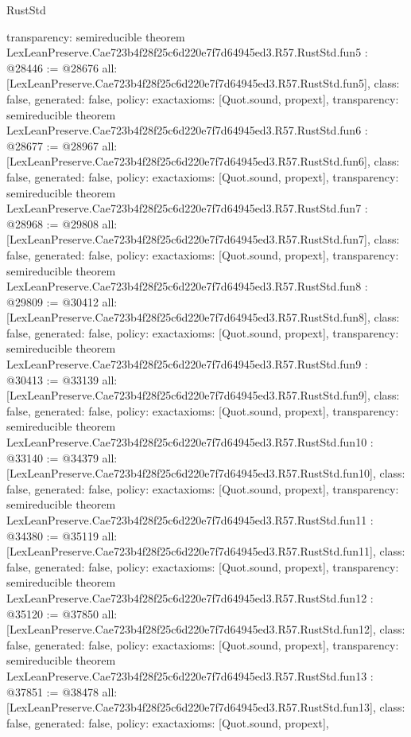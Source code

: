 \begin{lexlean}{RustStd}
\begin{coremodule}
{  transparency: semireducible
}
theorem LexLeanPreserve.Cae723b4f28f25c6d220e7f7d64945ed3.R57.RustStd.fun5 : @28446 := @28676 {
  all: [LexLeanPreserve.Cae723b4f28f25c6d220e7f7d64945ed3.R57.RustStd.fun5],
  class: false,
  generated: false,
  policy: exact{axioms: [Quot.sound, propext]},
  transparency: semireducible
}
theorem LexLeanPreserve.Cae723b4f28f25c6d220e7f7d64945ed3.R57.RustStd.fun6 : @28677 := @28967 {
  all: [LexLeanPreserve.Cae723b4f28f25c6d220e7f7d64945ed3.R57.RustStd.fun6],
  class: false,
  generated: false,
  policy: exact{axioms: [Quot.sound, propext]},
  transparency: semireducible
}
theorem LexLeanPreserve.Cae723b4f28f25c6d220e7f7d64945ed3.R57.RustStd.fun7 : @28968 := @29808 {
  all: [LexLeanPreserve.Cae723b4f28f25c6d220e7f7d64945ed3.R57.RustStd.fun7],
  class: false,
  generated: false,
  policy: exact{axioms: [Quot.sound, propext]},
  transparency: semireducible
}
theorem LexLeanPreserve.Cae723b4f28f25c6d220e7f7d64945ed3.R57.RustStd.fun8 : @29809 := @30412 {
  all: [LexLeanPreserve.Cae723b4f28f25c6d220e7f7d64945ed3.R57.RustStd.fun8],
  class: false,
  generated: false,
  policy: exact{axioms: [Quot.sound, propext]},
  transparency: semireducible
}
theorem LexLeanPreserve.Cae723b4f28f25c6d220e7f7d64945ed3.R57.RustStd.fun9 : @30413 := @33139 {
  all: [LexLeanPreserve.Cae723b4f28f25c6d220e7f7d64945ed3.R57.RustStd.fun9],
  class: false,
  generated: false,
  policy: exact{axioms: [Quot.sound, propext]},
  transparency: semireducible
}
theorem LexLeanPreserve.Cae723b4f28f25c6d220e7f7d64945ed3.R57.RustStd.fun10 : @33140 := @34379 {
  all: [LexLeanPreserve.Cae723b4f28f25c6d220e7f7d64945ed3.R57.RustStd.fun10],
  class: false,
  generated: false,
  policy: exact{axioms: [Quot.sound, propext]},
  transparency: semireducible
}
theorem LexLeanPreserve.Cae723b4f28f25c6d220e7f7d64945ed3.R57.RustStd.fun11 : @34380 := @35119 {
  all: [LexLeanPreserve.Cae723b4f28f25c6d220e7f7d64945ed3.R57.RustStd.fun11],
  class: false,
  generated: false,
  policy: exact{axioms: [Quot.sound, propext]},
  transparency: semireducible
}
theorem LexLeanPreserve.Cae723b4f28f25c6d220e7f7d64945ed3.R57.RustStd.fun12 : @35120 := @37850 {
  all: [LexLeanPreserve.Cae723b4f28f25c6d220e7f7d64945ed3.R57.RustStd.fun12],
  class: false,
  generated: false,
  policy: exact{axioms: [Quot.sound, propext]},
  transparency: semireducible
}
theorem LexLeanPreserve.Cae723b4f28f25c6d220e7f7d64945ed3.R57.RustStd.fun13 : @37851 := @38478 {
  all: [LexLeanPreserve.Cae723b4f28f25c6d220e7f7d64945ed3.R57.RustStd.fun13],
  class: false,
  generated: false,
  policy: exact{axioms: [Quot.sound, propext]},
}
\end{coremodule}
\end{lexlean}
